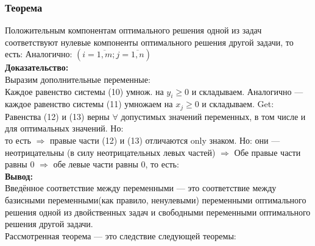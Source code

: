 \subsubsection{Теорема}
Положительным компонентам оптимального решения одной из задач соответствуют нулевые компоненты оптимального решения другой задачи, то есть:
Аналогично:
$(i=\overline{1,m}; j=\overline{1,n})$\\
\textbf{Доказательство:}\\
Выразим дополнительные переменные:\\
Каждое равенство системы (10) умнож. на $y_i \geq 0$ и складываем. Аналогично --- каждое равенство системы (11) умножаем на $x_j \geq 0$ и складываем. Get:
Равенства (12) и (13) верны $\forall$ допустимых значений переменных, в том числе и для оптимальных значений. Но: \\
то есть 
$\Rightarrow$ правые части (12) и (13) отличаются only знаком. Но: они --- неотрицательны (в силу неотрицательных левых частей) $\Rightarrow$ Обе правые части равны 0 $\Rightarrow$ обе левые части равны 0, то есть:
\qedsymbol\\
\textbf{Вывод:}\\
Введённое соответствие между переменными --- это соответствие между базисными переменными(как правило, ненулевыми) переменными оптимального решения одной из двойственных задач и свободными переменными оптимального решения другой задачи.\\
Рассмотренная теорема --- это следствие следующей теоремы:\\

